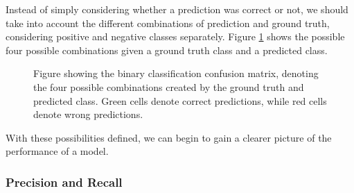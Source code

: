 \documentclass[UKenglish]{uiomasterthesis} %
\theoremstyle{definition}
\begin{document}
Instead of simply considering whether a prediction was correct or not, we should take into account the different combinations of prediction and ground truth, considering positive and negative classes separately. Figure \ref{fig:confusion} shows the possible four possible combinations given a ground truth class and a predicted class.

\begin{figure}[H]
    \begin{center}


\end{center}
    \caption[Binary classification confusion matrix]{Figure showing the binary classification confusion matrix, denoting the four possible combinations created by the ground truth and predicted class. Green cells denote correct predictions, while red cells denote wrong predictions.}
\label{fig:confusion}
\end{figure}

With these possibilities defined, we can begin to gain a clearer picture of the performance of a model.

\subsubsection{Precision and Recall}
\end{document}
